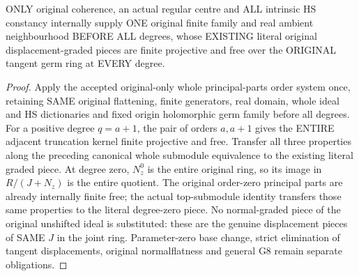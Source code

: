 \begin{theorem}
\label{hir:actual-hs-constant-centre-displacement-graded-free}
ONLY original coherence, an actual regular centre and ALL intrinsic
HS constancy internally supply ONE original finite family and real
ambient neighbourhood BEFORE ALL degrees, whose EXISTING literal
original displacement-graded pieces are finite projective and free
over the ORIGINAL tangent germ ring at EVERY degree.
\leanok
\end{theorem}
\begin{proof}
Apply the accepted original-only whole principal-parts order system once,
retaining SAME original flattening, finite generators, real domain,
whole ideal and HS dictionaries and fixed origin holomorphic germ family
before all degrees. For a positive degree $q=a+1$, the pair of orders
$a,a+1$ gives the ENTIRE adjacent truncation kernel finite projective
and free. Transfer all three properties along the preceding canonical
whole submodule equivalence to the existing literal graded piece.
At degree zero, $N_z^0$ is the entire original ring, so its image in
$R/(J+N_z)$ is the entire quotient. The original order-zero principal
parts are already internally finite free; the actual top-submodule
identity transfers those same properties to the literal degree-zero
piece. No normal-graded piece of the original unshifted ideal is
substituted: these are the genuine displacement pieces of SAME $J$
in the joint ring. Parameter-zero base change, strict elimination of
tangent displacements, original normalflatness and general G8 remain
separate obligations.
\end{proof}
